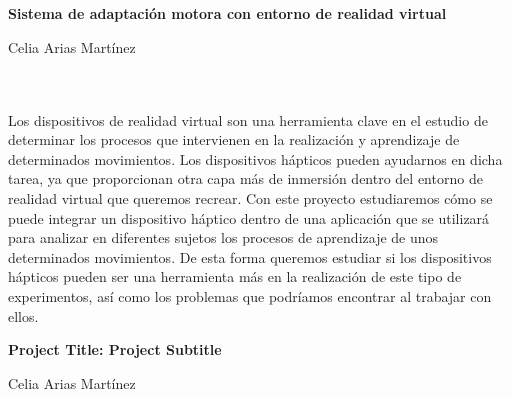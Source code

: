 \chapter*{}


%



\cleardoublepage
\thispagestyle{empty}

\begin{center}
{\large\bfseries Sistema de adaptación motora con entorno de realidad virtual}\\
\end{center}
\begin{center}
Celia Arias Martínez\\
\end{center}

\\

\vspace{0.7cm}
\\

Los dispositivos de realidad virtual son una herramienta clave en el estudio de determinar los procesos que intervienen en la realización y aprendizaje de determinados movimientos. Los dispositivos hápticos pueden ayudarnos en dicha tarea, ya que proporcionan otra capa más de inmersión dentro del entorno de realidad virtual que queremos recrear. Con este proyecto estudiaremos cómo se puede integrar un dispositivo háptico dentro de una aplicación que se utilizará para analizar en diferentes sujetos los procesos de aprendizaje de unos determinados movimientos. De esta forma queremos estudiar si los dispositivos hápticos pueden ser una herramienta más en la realización de este tipo de experimentos, así como los problemas que podríamos encontrar al trabajar con ellos.


\cleardoublepage


\thispagestyle{empty}


\begin{center}
{\large\bfseries Project Title: Project Subtitle}\\
\end{center}
\begin{center}
Celia Arias Martínez\\
\end{center}


